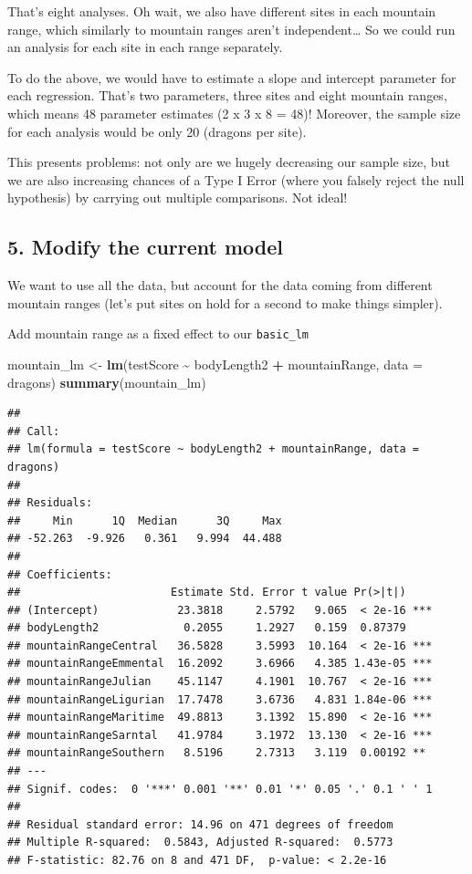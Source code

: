 \documentclass[
]{article}
\newenvironment{Shaded}{\begin{snugshade}}{\end{snugshade}}
\newcommand{\AttributeTok}[1]{\textcolor[rgb]{0.13,0.29,0.53}{#1}}
\newcommand{\FunctionTok}[1]{\textcolor[rgb]{0.13,0.29,0.53}{\textbf{#1}}}
\newcommand{\NormalTok}[1]{#1}
\newcommand{\OtherTok}[1]{\textcolor[rgb]{0.56,0.35,0.01}{#1}}
\newcommand{\SpecialCharTok}[1]{\textcolor[rgb]{0.81,0.36,0.00}{\textbf{#1}}}
\begin{document}
That's eight analyses. Oh wait, we also have different sites in each
mountain range, which similarly to mountain ranges aren't
independent\ldots{} So we could run an analysis for each site in each
range separately.

To do the above, we would have to estimate a slope and intercept
parameter for each regression. That's two parameters, three sites and
eight mountain ranges, which means 48 parameter estimates (2 x 3 x 8 =
48)! Moreover, the sample size for each analysis would be only 20
(dragons per site).

This presents problems: not only are we hugely decreasing our sample
size, but we are also increasing chances of a Type I Error (where you
falsely reject the null hypothesis) by carrying out multiple
comparisons. Not ideal!

\subsection{5. Modify the current model}\label{modify-the-current-model}

We want to use all the data, but account for the data coming from
different mountain ranges (let's put sites on hold for a second to make
things simpler).

Add mountain range as a fixed effect to our \texttt{basic\_lm}

\begin{Shaded}
\begin{Highlighting}[]
\NormalTok{mountain\_lm }\OtherTok{\textless{}{-}} \FunctionTok{lm}\NormalTok{(testScore }\SpecialCharTok{\textasciitilde{}}\NormalTok{ bodyLength2 }\SpecialCharTok{+}\NormalTok{ mountainRange, }\AttributeTok{data =}\NormalTok{ dragons)}
\FunctionTok{summary}\NormalTok{(mountain\_lm)}
\end{Highlighting}
\end{Shaded}

\begin{verbatim}
## 
## Call:
## lm(formula = testScore ~ bodyLength2 + mountainRange, data = dragons)
## 
## Residuals:
##     Min      1Q  Median      3Q     Max 
## -52.263  -9.926   0.361   9.994  44.488 
## 
## Coefficients:
##                       Estimate Std. Error t value Pr(>|t|)    
## (Intercept)            23.3818     2.5792   9.065  < 2e-16 ***
## bodyLength2             0.2055     1.2927   0.159  0.87379    
## mountainRangeCentral   36.5828     3.5993  10.164  < 2e-16 ***
## mountainRangeEmmental  16.2092     3.6966   4.385 1.43e-05 ***
## mountainRangeJulian    45.1147     4.1901  10.767  < 2e-16 ***
## mountainRangeLigurian  17.7478     3.6736   4.831 1.84e-06 ***
## mountainRangeMaritime  49.8813     3.1392  15.890  < 2e-16 ***
## mountainRangeSarntal   41.9784     3.1972  13.130  < 2e-16 ***
## mountainRangeSouthern   8.5196     2.7313   3.119  0.00192 ** 
## ---
## Signif. codes:  0 '***' 0.001 '**' 0.01 '*' 0.05 '.' 0.1 ' ' 1
## 
## Residual standard error: 14.96 on 471 degrees of freedom
## Multiple R-squared:  0.5843, Adjusted R-squared:  0.5773 
## F-statistic: 82.76 on 8 and 471 DF,  p-value: < 2.2e-16
\end{verbatim}
\end{document}
